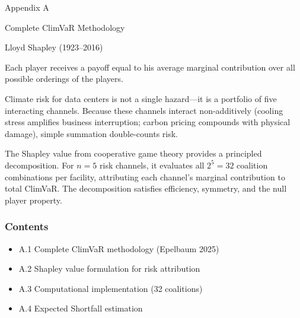 \begin{center}
{\displayfont\fontsize{24}{28}\selectfont\color{SEGreen}Appendix A\par}
\vspace{2mm}
{\displayfont\fontsize{18}{22}\selectfont\color{SESubtitle}Complete ClimVaR Methodology\par}
\vspace{2mm}
{\fontsize{9}{11}\selectfont\color{SESubtitle}Lloyd Shapley (1923--2016)\par}
\end{center}

\vspace{4mm}

\begin{pullquote}
Each player receives a payoff equal to his average marginal contribution over all possible orderings of the players.
\end{pullquote}

\vspace{4mm}

\begin{twocolbody}
\noindent Climate risk for data centers is not a single hazard---it is a portfolio of five interacting channels. Because these channels interact non-additively (cooling stress amplifies business interruption; carbon pricing compounds with physical damage), simple summation double-counts risk.

The Shapley value from cooperative game theory provides a principled decomposition. For $n=5$ risk channels, it evaluates all $2^5 = 32$ coalition combinations per facility, attributing each channel's marginal contribution to total ClimVaR. The decomposition satisfies efficiency, symmetry, and the null player property.

\subsubsection*{Contents}
\begin{itemize}[leftmargin=10pt, itemsep=2pt]
  \item A.1 Complete ClimVaR methodology (Epelbaum 2025)
  \item A.2 Shapley value formulation for risk attribution
  \item A.3 Computational implementation (32 coalitions)
  \item A.4 Expected Shortfall estimation
\end{itemize}
\end{twocolbody}

